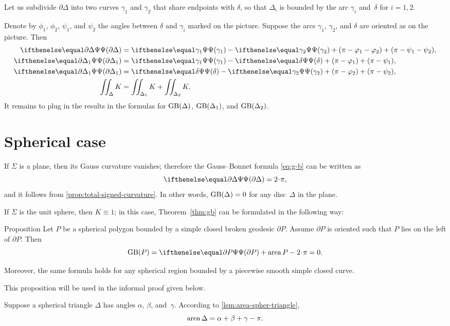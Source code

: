 Let us subdivide $\partial \Delta$ into two curves $\gamma_1$ and $\gamma_2$ that share endpoints with $\delta$, so that
 $\Delta_i$ is bounded by the arc $\gamma_i$  and~$\delta$ for $i=1,2.$

Denote by $\phi_1$, $\phi_2$, $\psi_1$, and $\psi_2$ the angles between $\delta$ and $\gamma_i$ marked on the picture.
Suppose the arcs $\gamma_1$, $\gamma_2$, and $\delta$ are oriented as on the picture. 
Then
\begin{align*}
\tgc{\partial \Delta}&= \tgc{\gamma_1}-\tgc{\gamma_2}+(\pi-\phi_1-\phi_2)+(\pi-\psi_1-\psi_2),
\\
\tgc{\partial \Delta_1}&= \tgc{\gamma_1}-\tgc\delta+(\pi-\phi_1)+(\pi-\psi_1),
\\
\tgc{\partial \Delta_1}&= \tgc\delta-\tgc{\gamma_2}+(\pi-\phi_2)+(\pi-\psi_2),
\\
\iint_\Delta K&=\iint_{\Delta_1} K+\iint_{\Delta_2} K.
\end{align*}
It remains to plug in the results in the formulas for $\mathop{\rm GB}\nolimits(\Delta)$, $\mathop{\rm GB}\nolimits(\Delta_1)$, and $\mathop{\rm GB}\nolimits(\Delta_2)$.
\qeds

\section{Spherical case}

If $\Sigma$ is a plane, then its Gauss curvature vanishes;
therefore the Gauss--Bonnet formula \ref{eq:g-b} can be written as 
\[\tgc{\partial\Delta}=2\cdot \pi,\]
and it follows from \ref{prop:total-signed-curvature}.
In other words, $\mathop{\rm GB}\nolimits(\Delta)=0$ for any disc~$\Delta$ in the plane.

If $\Sigma$ is the unit sphere, then $K\equiv1$;
in this case, Theorem~\ref{thm:gb} can be formulated in the following way:

\begin{thm}{Proposition}\label{prop:area-of-spher-polygon}
Let $P$ be a spherical polygon bounded by a simple closed broken geodesic $\partial P$.
Assume $\partial P$ is oriented such that $P$ lies on the left of $\partial P$.
Then 
\[\GB(P)=\tgc{\partial P}+\area P-2\cdot \pi=0.\]

Moreover, the same formula holds for any spherical region bounded by a piecewise smooth simple closed curve.
\end{thm}

This proposition will be used in the informal proof given below.

Suppose a spherical triangle $\Delta$ has angles 
$\alpha$, $\beta$, and~$\gamma$.
According to \ref{lem:area-spher-triangle},
\[\mathop{\rm area}\nolimits\Delta=\alpha+\beta+\gamma-\pi.\]


